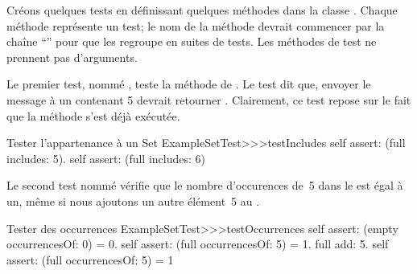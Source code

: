 \documentclass[a4paper,10pt,twoside]{book}
\begin{document}
Créons quelques tests en définissant quelques méthodes dans la classe .
Chaque méthode représente un test;
le nom de la méthode devrait commencer par la chaîne ``'' pour que \sunit les regroupe en suites de tests.
Les méthodes de test ne prennent pas d'arguments.


Le premier test, nommé , teste la méthode  de . Le test dit que, envoyer le message  à un  contenant 5 devrait retourner . Clairement, ce test repose sur le fait que la méthode  s'est déjà exécutée.


\begin{method}[testIncludes]{Tester l'appartenance à un Set}
ExampleSetTest>>>testIncludes
	self assert: (full includes: 5).
	self assert: (full includes: 6)
\end{method}

Le second test nommé  vérifie que le nombre d'occurences de~5 dans le   est égal à un, même si nous ajoutons un autre élément~5 au .

\begin{method}[testOccurrences]{Tester des occurrences}
ExampleSetTest>>>testOccurrences
	self assert: (empty occurrencesOf: 0) = 0.
	self assert: (full occurrencesOf: 5) = 1.
	full add: 5.
	self assert: (full occurrencesOf: 5) = 1
\end{method}
\end{document}
